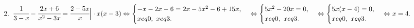 2. $\cfrac{1}{3-x}-\cfrac{2x+6}{x^2-3x}=\cfrac{2-5x}{x}\Big|\cdot x(x-3)\Leftrightarrow
\begin{cases}
-x-2x-6=2x-5x^2-6+15x,\\
x
eq0,\ x
eq 3.\end{cases}\Leftrightarrow\begin{cases}
5x^2-20x=0,\\
x
eq0,\ x
eq 3.\end{cases}\Leftrightarrow\begin{cases}
5x(x-4)=0,\\
x
eq0,\ x
eq 3.\end{cases}\Leftrightarrow x=4.$\\
